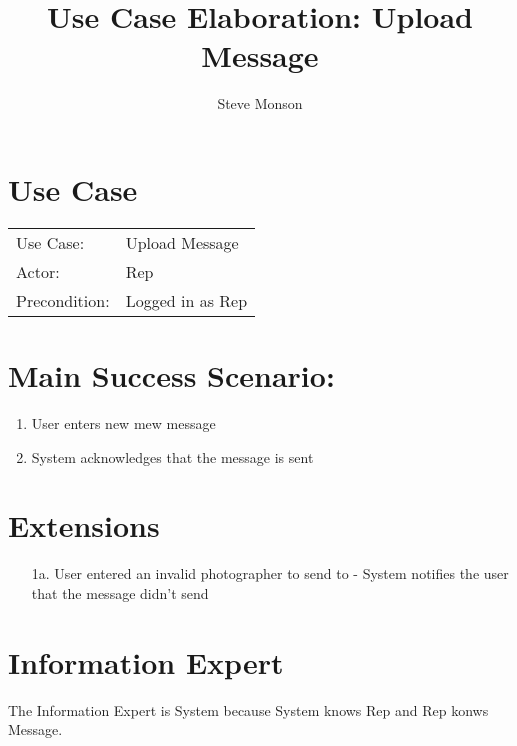 \documentclass{article}
\title{Use Case Elaboration: Upload Message}
\author{ Steve Monson }
\begin{document}
\maketitle


\section*{Use Case}
\begin{tabular}{l l}
Use Case:     & Upload Message\\
Actor:        & Rep\\
Precondition: & Logged in as Rep\\
\end{tabular}


\section*{Main Success Scenario:}

\begin{enumerate}
    \item User enters new mew message
    \item System acknowledges that the message is sent

\end{enumerate}

\section*{Extensions}

\begin{itemize}
    \item [1a.] User entered an invalid photographer to send to
            - System notifies the user that the message didn't send
                            
\end{itemize}


\section*{Information Expert}

The Information Expert is System because System knows Rep and Rep konws Message. 
\end{document}
